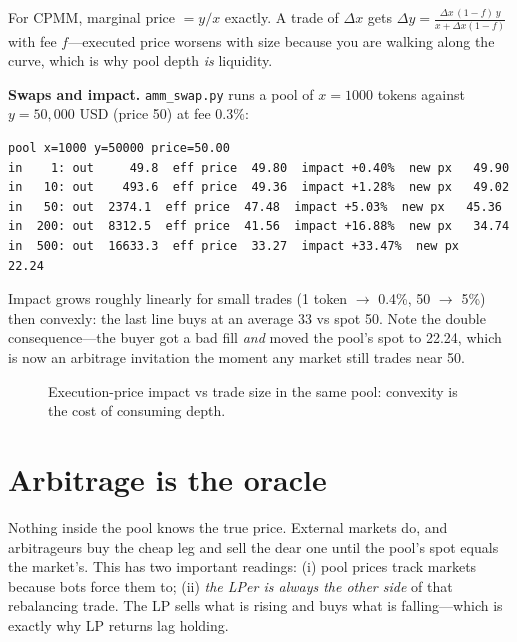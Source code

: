 \begin{principle}
For CPMM, marginal price $=y/x$ exactly. A trade of $\Delta x$ gets
$\Delta y = \frac{\Delta x\,(1-f)\,y}{x+\Delta x(1-f)}$ with fee $f$---executed price worsens
with size because you are walking along the curve, which is why pool depth \emph{is}
liquidity.
\end{principle}

\begin{example}\label{ex:amm}
\textbf{Swaps and impact.} \texttt{amm\_swap.py} runs a pool of $x{=}1000$ tokens against
$y{=}50{,}000$ USD (price 50) at fee 0.3\%:
\begin{lstlisting}[numbers=none]
pool x=1000 y=50000 price=50.00
in    1: out     49.8  eff price  49.80  impact +0.40%  new px   49.90
in   10: out    493.6  eff price  49.36  impact +1.28%  new px   49.02
in   50: out  2374.1  eff price  47.48  impact +5.03%  new px   45.36
in  200: out  8312.5  eff price  41.56  impact +16.88%  new px   34.74
in  500: out  16633.3  eff price  33.27  impact +33.47%  new px   22.24
\end{lstlisting}
\begin{solution}
Impact grows roughly linearly for small trades (1 token $\to$ 0.4\%, 50 $\to$ 5\%) then
convexly: the last line buys at an average 33 vs spot 50. Note the double consequence---the
buyer got a bad fill \emph{and} moved the pool's spot to 22.24, which is now an arbitrage
invitation the moment any market still trades near 50.
\end{solution}
\end{example}

\begin{figure}[htbp]\centering

\caption{Execution-price impact vs trade size in the same pool: convexity is the cost of
consuming depth.}
\label{fig:impact}
\end{figure}

\section{Arbitrage is the oracle}\label{sec:amm-arb}

Nothing inside the pool knows the true price. External markets do, and arbitrageurs buy the
cheap leg and sell the dear one until the pool's spot equals the market's. This has two
important readings: (i) pool prices track markets because bots force them to; (ii) \emph{the
LPer is always the other side} of that rebalancing trade. The LP sells what is rising and
buys what is falling---which is exactly why LP returns lag holding.

